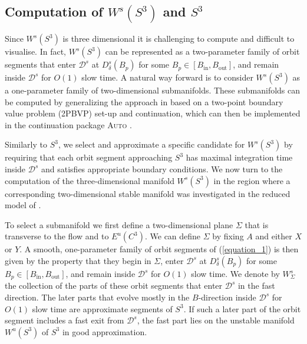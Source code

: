 \documentclass{ws-ijbc}
\begin{document}
\subsection{Computation of $W^{s}(S^3)$ and  $S^3$}

Since $W^{s}(S^3)$ is three dimensional it is challenging to compute and difficult to visualise.  In fact, $W^{s}(S^3)$ can be represented as a two-parameter family of orbit segments that enter $\mathscr{D}^s$ at $D^s_{\delta}(B_p)$ for some $B_p \in [B_{\text{in}}, B_{\text{out}}]$, and remain inside $\mathscr{D}^s$ for $O(1)$ slow time.  A natural way forward is to consider $W^{s}(S^3)$ as a one-parameter family of two-dimensional submanifolds.  These submanifolds can be computed by generalizing the approach in \cite{Saeed_Paper} based on a two-point boundary value problem (2PBVP) set-up and continuation, which can then be implemented in the continuation package \textsc{Auto} \cite{AUTO}.  

Similarly to $S^3$, we select and approximate a specific candidate for $W^{s}(S^3)$ by requiring that each orbit segment approaching $S^3$ has maximal integration time inside $\mathscr{D}^s$ and satisfies appropriate boundary conditions.  We now turn to the computation of the three-dimensional manifold $W^{s}(S^3)$ in the region where a corresponding two-dimensional stable manifold was investigated in the reduced model of \cite{QSSA}.

To select a submanifold we first define a two-dimensional plane $\Sigma$ that is transverse to the flow and to $E^u(C^3)$.  We can define $\Sigma$ by fixing $A$ and either $X$ or $Y$.  A smooth, one-parameter family of orbit segments of (\ref{equation_1}) is then given by the property that they begin in $\Sigma$, enter $\mathscr{D}^s$ at $D^s_{\delta}(B_p)$ for some $B_p \in [B_{\text{in}}, B_{\text{out}}]$, and remain inside $\mathscr{D}^s$ for $O(1)$ slow time.  We denote by $W^{s}_{\Sigma}$ the collection of the parts of these orbit segments that enter $\mathscr{D}^s$ in the fast direction.  The later parts that evolve mostly in the $B$-direction inside $\mathscr{D}^s$ for $O(1)$ slow time are approximate segments of $S^3$.  If such a later part of the orbit segment includes a fast exit from $\mathscr{D}^s$, the fast part lies on the unstable manifold $W^{u}(S^3)$ of $S^3$ in good approximation.
\end{document}
